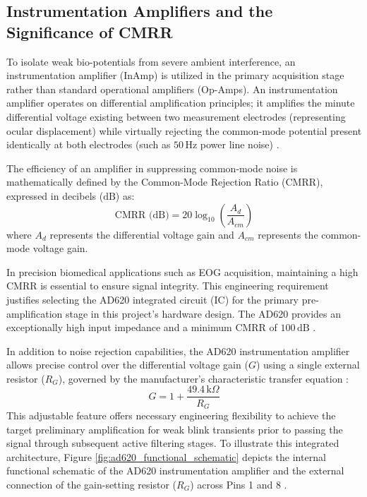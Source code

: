 \FloatBarrier
\subsection{Instrumentation Amplifiers and the Significance of CMRR}
\label{subsec:instrumentation_amp_cmrr}

To isolate weak bio-potentials from severe ambient interference, an instrumentation amplifier (InAmp) is utilized in the primary acquisition stage rather than standard operational amplifiers (Op-Amps). An instrumentation amplifier operates on differential amplification principles; it amplifies the minute differential voltage existing between two measurement electrodes (representing ocular displacement) while virtually rejecting the common-mode potential present identically at both electrodes (such as $50\,\text{Hz}$ power line noise) \cite{webster2009medical}.

The efficiency of an amplifier in suppressing common-mode noise is mathematically defined by the Common-Mode Rejection Ratio ($\text{CMRR}$), expressed in decibels ($\text{dB}$) as:
\begin{equation}
\text{CMRR (dB)} = 20 \log_{10} \left( \frac{A_d}{A_{cm}} \right)
\label{eq:cmrr_formula}
\end{equation}
where $A_d$ represents the differential voltage gain and $A_{cm}$ represents the common-mode voltage gain.

In precision biomedical applications such as EOG acquisition, maintaining a high $\text{CMRR}$ is essential to ensure signal integrity. This engineering requirement justifies selecting the AD620 integrated circuit (IC) for the primary pre-amplification stage in this project's hardware design. The AD620 provides an exceptionally high input impedance and a minimum $\text{CMRR}$ of $100\,\text{dB}$ \cite{ad620datasheet}.

In addition to noise rejection capabilities, the AD620 instrumentation amplifier allows precise control over the differential voltage gain ($G$) using a single external resistor ($R_G$), governed by the manufacturer's characteristic transfer equation \cite{ad620datasheet}:
\begin{equation}
G = 1 + \frac{49.4\,\text{k}\Omega}{R_G}
\label{eq:ad620_transfer}
\end{equation}
This adjustable feature offers necessary engineering flexibility to achieve the target preliminary amplification for weak blink transients prior to passing the signal through subsequent active filtering stages. To illustrate this integrated architecture, Figure \ref{fig:ad620_functional_schematic} depicts the internal functional schematic of the AD620 instrumentation amplifier and the external connection of the gain-setting resistor ($R_G$) across Pins 1 and 8 \cite{ad620datasheet}.

